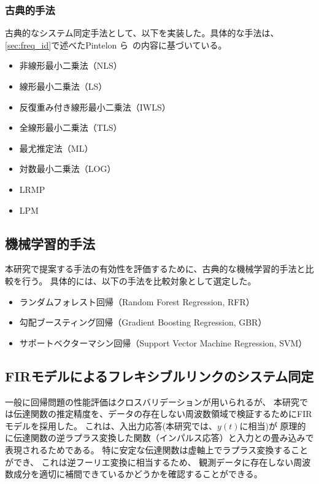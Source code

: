 \subsubsection{古典的手法}
\label{sec:classical_methods}
古典的なシステム同定手法として、以下を実装した。具体的な手法は、\ref{sec:freq_id}で述べたPintelon ら~\cite{pintelon1994parametric}の内容に基づいている。
\begin{itemize}
  \item 非線形最小二乗法（NLS）
  \item 線形最小二乗法（LS）
  \item 反復重み付き線形最小二乗法（IWLS）
  \item 全線形最小二乗法（TLS）
  \item 最尤推定法（ML）
  \item 対数最小二乗法（LOG）
  \item LRMP
  \item LPM
\end{itemize}

\subsection{機械学習的手法}
\label{sec:ml_methods}
本研究で提案する手法の有効性を評価するために、古典的な機械学習的手法と比較を行う。
具体的には、以下の手法を比較対象として選定した。
\begin{itemize}
  \item ランダムフォレスト回帰（Random Forest Regression, RFR）
  \item 勾配ブースティング回帰（Gradient Boosting Regression, GBR）
  \item サポートベクターマシン回帰（Support Vector Machine Regression, SVM）
\end{itemize}

\subsection{FIRモデルによるフレキシブルリンクのシステム同定}
\label{sec:fir_model}
一般に回帰問題の性能評価はクロスバリデーションが用いられるが、
本研究では伝達関数の推定精度を、データの存在しない周波数領域で検証するためにFIRモデルを採用した。
これは、入出力応答(本研究では、\(y(t)\)に相当)が
原理的に伝達関数の逆ラプラス変換した関数（インパルス応答）と入力との畳み込みで表現されるためである。
特に安定な伝達関数は虚軸上でラプラス変換することができ、
これは逆フーリエ変換に相当するため、
観測データに存在しない周波数成分を適切に補間できているかどうかを確認することができる。

